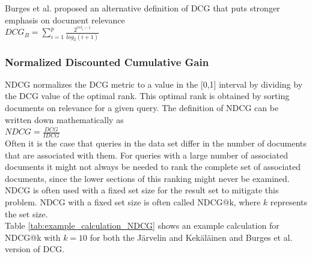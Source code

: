 Burges et al. \cite{Burges2005} proposed an alternative definition of \ac{DCG} that puts stronger emphasis on document relevance\\

$DCG_{B} = \sum\nolimits_{i=1}^p \frac{2^{rel_i-1}}{log_2(i+1)}$\\

\subsubsection{Normalized Discounted Cumulative Gain}
\ac{NDCG} normalizes the \ac{DCG} metric to a value in the [0,1] interval by dividing by the \ac{DCG} value of the optimal rank. This optimal rank is obtained by sorting documents on relevance for a given query. The definition of \ac{NDCG} can be written down mathematically as\\

$NDCG = \frac{DCG}{IDCG}$\\

Often it is the case that queries in the data set differ in the number of documents that are associated with them. For queries with a large number of associated documents it might not always be needed to rank the complete set of associated documents, since the lower sections of this ranking might never be examined. \acl{NDCG} is often used with a fixed set size for the result set to mitigate this problem. \ac{NDCG} with a fixed set size is often called \ac{NDCG}@k, where $k$ represents the set size.\\

Table \ref{tab:example_calculation_NDCG} shows an example calculation for \ac{NDCG}@k with $k=10$ for both the J{\"a}rvelin and Kek{\"a}l{\"a}inen \cite{Jarvelin2002} and Burges et al. \cite{Burges2005} version of \ac{DCG}.\\

